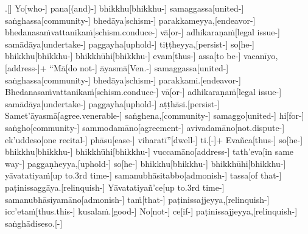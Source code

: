 \documentclass[12pt]{article}
\begin{document}
\begin{paracol}{2}
\begin{column}
\switchcolumn


\begin{flushleft}
.[] Yo[who-] pana[(and)-] bhikkhu[bhikkhu-] samaggassa[united-] saṅghassa[community-] bhedāya[schism-] parakkameyya,[endeavor-] bhedanasaṁvattanikaṁ[schism.conduce-] vā[or-] adhikaraṇaṁ[legal issue-] samādāya[undertake-] paggayha[uphold-] tiṭṭheyya,[persist-] so[he-] bhikkhu[bhikkhu-] bhikkhūhi[bhikkhu-] evam[thus-] assa[to be-] vacanīyo,[address-]+ “Mā[do not-] āyasmā[Ven.-] samaggassa[united-] saṅghassa[community-] bhedāya[schism-] parakkami.[endeavor-] Bhedanasaṁvattanikaṁ[schism.conduce-] vā[or-] adhikaraṇaṁ[legal issue-] samādāya[undertake-] paggayha[uphold-] aṭṭhāsi.[persist-] Samet’āyasmā[agree.venerable-] saṅghena,[community-] samaggo[united-] hi[for-] saṅgho[community-] sammodamāno[agreement-] avivadamāno[not.dispute-] ek’uddeso[one recital-] phāsu[ease-] viharatī”[dwell-] ti.[-\NUL{\GMU{}}]+ Evañca[thus-] so[he-] bhikkhu[bhikkhu-] bhikkhūhi[bhikkhu-] vuccamāno[address-] tath’eva[in same way-\NUL{\GMU{}}] paggaṇheyya,[uphold-] so[he-] bhikkhu[bhikkhu-] bhikkhūhi[bhikkhu-] yāvatatiyaṁ[up to.3rd time-] samanubhāsitabbo[admonish-] tassa[of that-] paṭinissaggāya.[relinquish-] Yāvatatiyañ’ce[up to.3rd time-] samanubhāsiyamāno[admonish-] taṁ[that-] paṭinissajjeyya,[relinquish-] icc’etaṁ[thus.this-] kusalaṁ.[good-] No[not-] ce[if-\NUL{\GMU{}}] paṭinissajjeyya,[relinquish-] saṅghādiseso.[-\NUL{\GMU{}}]
\endgl
\switchcolumn*
\end{flushleft}



\end{column}
\end{paracol}
\end{document}
